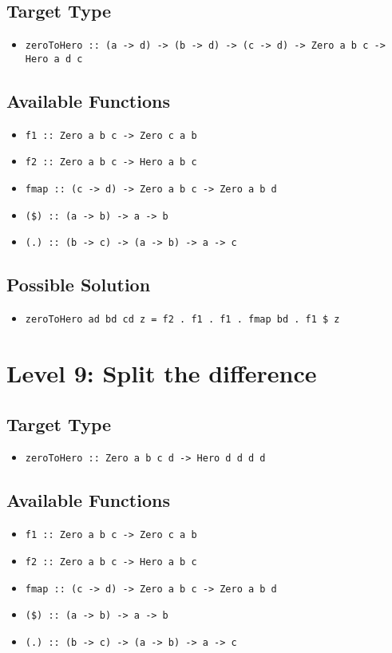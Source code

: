 \subsection{Target Type } 
\begin{itemize}
    \item \texttt{zeroToHero :: (a -> d) -> (b -> d) -> (c -> d) -> Zero a b c ->  Hero a d c}
\end{itemize}

\subsection{Available Functions} 
\begin{itemize}
    \item \texttt{f1 :: Zero a b c -> Zero c a b}
    \item \texttt{f2 :: Zero a b c -> Hero a b c}
    \item \texttt{fmap :: (c -> d) -> Zero a b c -> Zero a b d}
    \item \texttt{(\$) :: (a -> b) -> a -> b}
    \item \texttt{(.) :: (b -> c) -> (a -> b) -> a -> c}
\end{itemize}

\subsection{Possible Solution} 
\begin{itemize}
    \item \texttt{zeroToHero ad bd cd z = f2  . f1  . f1  . fmap bd  . f1 \$ z}
\end{itemize}

\section{Level 9: Split the difference}
\subsection{Target Type } 
\begin{itemize}
    \item \texttt{zeroToHero :: Zero a b c d ->  Hero d d d d}
\end{itemize}

\subsection{Available Functions} 
\begin{itemize}
    \item \texttt{f1 :: Zero a b c -> Zero c a b}
    \item \texttt{f2 :: Zero a b c -> Hero a b c}
    \item \texttt{fmap :: (c -> d) -> Zero a b c -> Zero a b d}
    \item \texttt{(\$) :: (a -> b) -> a -> b}
    \item \texttt{(.) :: (b -> c) -> (a -> b) -> a -> c}
\end{itemize}

